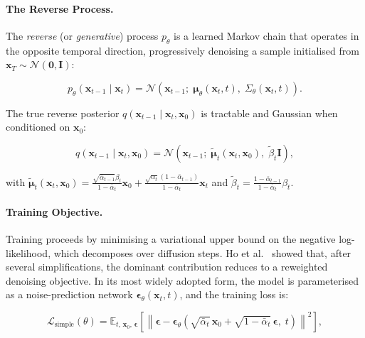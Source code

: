 \paragraph{The Reverse Process.}
The \emph{reverse} (or \emph{generative}) process $p_\theta$ is a learned
Markov chain that operates in the opposite temporal direction, progressively
denoising a sample initialised from $\mathbf{x}_T \sim \mathcal{N}(\mathbf{0},
\mathbf{I})$:

\begin{equation}
    p_\theta(\mathbf{x}_{t-1} \mid \mathbf{x}_t) =
    \mathcal{N}\!\left(\mathbf{x}_{t-1};\;
    \boldsymbol{\mu}_\theta(\mathbf{x}_t, t),\;
    \Sigma_\theta(\mathbf{x}_t, t)\right).
    \label{eq:ddpm_reverse}
\end{equation}

The true reverse posterior $q(\mathbf{x}_{t-1} \mid \mathbf{x}_t, \mathbf{x}_0)$
is tractable and Gaussian when conditioned on $\mathbf{x}_0$:

\begin{equation}
    q(\mathbf{x}_{t-1} \mid \mathbf{x}_t, \mathbf{x}_0) =
    \mathcal{N}\!\left(\mathbf{x}_{t-1};\;
    \tilde{\boldsymbol{\mu}}_t(\mathbf{x}_t, \mathbf{x}_0),\;
    \tilde{\beta}_t \mathbf{I}\right),
    \label{eq:ddpm_posterior}
\end{equation}

\noindent with $\tilde{\boldsymbol{\mu}}_t(\mathbf{x}_t, \mathbf{x}_0) =
\frac{\sqrt{\bar{\alpha}_{t-1}}\beta_t}{1 - \bar{\alpha}_t}\mathbf{x}_0 +
\frac{\sqrt{\alpha_t}(1 - \bar{\alpha}_{t-1})}{1 - \bar{\alpha}_t}\mathbf{x}_t$
and $\tilde{\beta}_t = \frac{1 - \bar{\alpha}_{t-1}}{1 - \bar{\alpha}_t}\beta_t$.

\paragraph{Training Objective.}
Training proceeds by minimising a variational upper bound on the negative
log-likelihood, which decomposes over diffusion steps. Ho et al.\
\cite{ho2020denoising} showed that, after several simplifications, the
dominant contribution reduces to a reweighted denoising objective. In its
most widely adopted form, the model is parameterised as a noise-prediction
network $\boldsymbol{\epsilon}_\theta(\mathbf{x}_t, t)$, and the training
loss is:

\begin{equation}
    \mathcal{L}_{\text{simple}}(\theta) =
    \mathbb{E}_{t,\, \mathbf{x}_0,\, \boldsymbol{\epsilon}}
    \left[\left\|
    \boldsymbol{\epsilon} -
    \boldsymbol{\epsilon}_\theta\!\left(
    \sqrt{\bar{\alpha}_t}\,\mathbf{x}_0 +
    \sqrt{1 - \bar{\alpha}_t}\,\boldsymbol{\epsilon},\; t
    \right)
    \right\|^2\right],
    \label{eq:ddpm_loss}
\end{equation}

